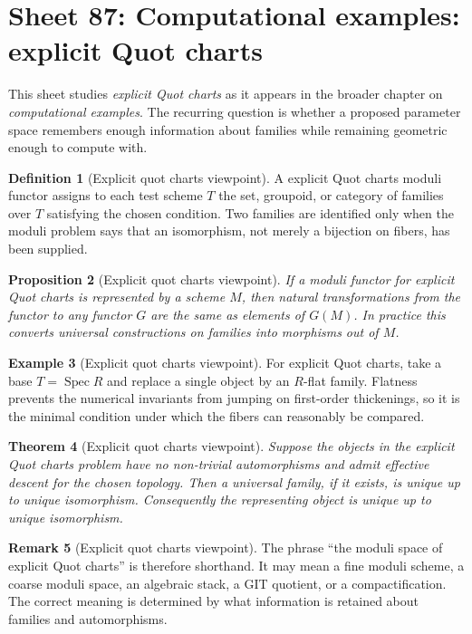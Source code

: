 \documentclass[11pt]{amsart}
\newtheorem{theorem}{Theorem}[section]
\newtheorem{proposition}[theorem]{Proposition}
\theoremstyle{definition}
\newtheorem{definition}[theorem]{Definition}
\newtheorem{example}[theorem]{Example}
\newtheorem{remark}[theorem]{Remark}
\newcommand{\Spec}{\operatorname{Spec}}
\begin{document}
\section{Sheet 87: Computational examples: explicit Quot charts}
This sheet studies \emph{explicit Quot charts} as it appears in the broader chapter on \emph{computational examples}.  The recurring question is whether a proposed parameter space remembers enough information about families while remaining geometric enough to compute with.
\begin{definition}[Explicit quot charts viewpoint]
A explicit Quot charts moduli functor assigns to each test scheme $T$ the set, groupoid, or category of families over $T$ satisfying the chosen condition.  Two families are identified only when the moduli problem says that an isomorphism, not merely a bijection on fibers, has been supplied.
\end{definition}
\begin{proposition}[Explicit quot charts viewpoint]
If a moduli functor for explicit Quot charts is represented by a scheme $M$, then natural transformations from the functor to any functor $G$ are the same as elements of $G(M)$.  In practice this converts universal constructions on families into morphisms out of $M$.
\end{proposition}
\begin{example}[Explicit quot charts viewpoint]
For explicit Quot charts, take a base $T=\Spec R$ and replace a single object by an $R$-flat family.  Flatness prevents the numerical invariants from jumping on first-order thickenings, so it is the minimal condition under which the fibers can reasonably be compared.
\end{example}
\begin{theorem}[Explicit quot charts viewpoint]
Suppose the objects in the explicit Quot charts problem have no non-trivial automorphisms and admit effective descent for the chosen topology.  Then a universal family, if it exists, is unique up to unique isomorphism.  Consequently the representing object is unique up to unique isomorphism.
\end{theorem}
\begin{remark}[Explicit quot charts viewpoint]
The phrase ``the moduli space of explicit Quot charts'' is therefore shorthand.  It may mean a fine moduli scheme, a coarse moduli space, an algebraic stack, a GIT quotient, or a compactification.  The correct meaning is determined by what information is retained about families and automorphisms.
\end{remark}
\end{document}
